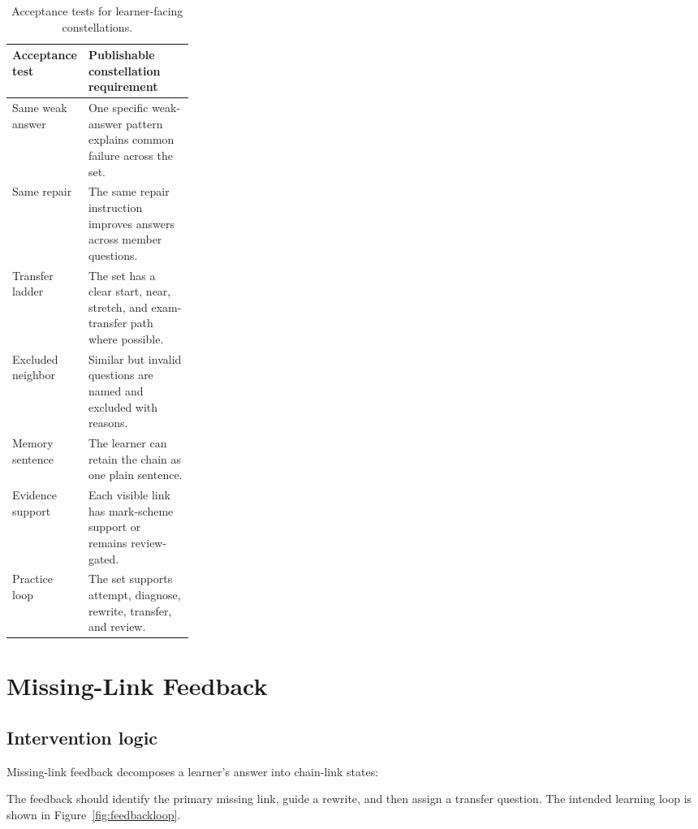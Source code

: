 \documentclass[11pt]{article}
\begin{document}
\begin{table}[H]
\centering
\small
\begin{tabularx}{\linewidth}{L{0.26\linewidth}Y}
\toprule
\textbf{Acceptance test} & \textbf{Publishable constellation requirement}\\
\midrule
Same weak answer & One specific weak-answer pattern explains common failure across the set.\\
Same repair & The same repair instruction improves answers across member questions.\\
Transfer ladder & The set has a clear start, near, stretch, and exam-transfer path where possible.\\
Excluded neighbor & Similar but invalid questions are named and excluded with reasons.\\
Memory sentence & The learner can retain the chain as one plain sentence.\\
Evidence support & Each visible link has mark-scheme support or remains review-gated.\\
Practice loop & The set supports attempt, diagnose, rewrite, transfer, and review.\\
\bottomrule
\end{tabularx}
\caption{Acceptance tests for learner-facing constellations.}
\label{tab:acceptance}
\end{table}

\section{Missing-Link Feedback}

\subsection{Intervention logic}

Missing-link feedback decomposes a learner's answer into chain-link states:

\begin{center}
\end{center}

The feedback should identify the primary missing link, guide a rewrite, and then assign a transfer question. The intended learning loop is shown in Figure~\ref{fig:feedbackloop}.
\end{document}
